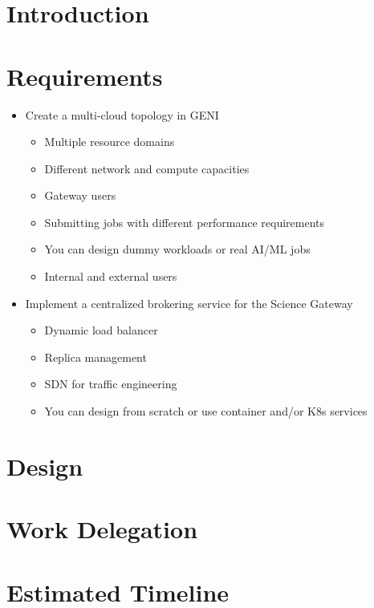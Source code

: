 \documentclass{ReportCUNY}
\begin{document}
\setlength{\belowdisplayskip}{0pt} \setlength{\belowdisplayshortskip}{1pt}
\setlength{\abovedisplayskip}{0pt} \setlength{\abovedisplayshortskip}{1pt}
\setlength{\abovedisplayskip}{5pt}
\setlength{\belowdisplayskip}{5pt}

\section{Introduction}

\section{Requirements}

\begin{itemize}
\item Create a multi-cloud topology in GENI
\begin{itemize}
	\item Multiple resource domains
	\item Different network and compute capacities
	\item Gateway users
	\item Submitting jobs with different performance requirements
	\item You can design dummy workloads or real AI/ML jobs
	\item Internal and external users
\end{itemize}

\item Implement a centralized brokering service for the Science Gateway
\begin{itemize}
	\item Dynamic load balancer
	\item Replica management
	\item SDN for traffic engineering
	\item You can design from scratch or use container and/or K8s services
\end{itemize}

\end{itemize}


\section{Design}


\section{Work Delegation}


\section{Estimated Timeline}
\end{document}
